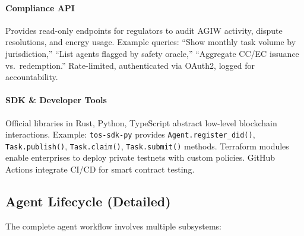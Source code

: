 \documentclass[11pt]{article}
\begin{document}
\paragraph{Compliance API} Provides read-only endpoints for regulators to audit AGIW activity, dispute resolutions, and energy usage. Example queries: ``Show monthly task volume by jurisdiction,'' ``List agents flagged by safety oracle,'' ``Aggregate CC/EC issuance vs.\ redemption.'' Rate-limited, authenticated via OAuth2, logged for accountability.

\paragraph{SDK \& Developer Tools} Official libraries in Rust, Python, TypeScript abstract low-level blockchain interactions. Example: \texttt{tos-sdk-py} provides \texttt{Agent.register\_did()}, \texttt{Task.publish()}, \texttt{Task.claim()}, \texttt{Task.submit()} methods. Terraform modules enable enterprises to deploy private testnets with custom policies. GitHub Actions integrate CI/CD for smart contract testing.

\subsection{Agent Lifecycle (Detailed)}
The complete agent workflow involves multiple subsystems:
\end{document}
